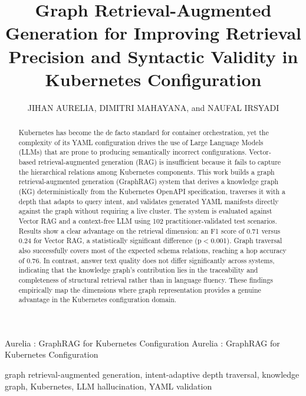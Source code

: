 \documentclass{ieeeaccess}
\begin{document}

\title{Graph Retrieval-Augmented Generation for Improving Retrieval Precision and Syntactic Validity in Kubernetes Configuration}

\author{\uppercase{Jihan Aurelia}, \uppercase{Dimitri Mahayana}, and \uppercase{Naufal Irsyadi}}
\address[1]{School of Electrical Engineering and Informatics, Institut Teknologi Bandung, Bandung 40132, Indonesia}

\markboth
{Aurelia \headeretal: GraphRAG for Kubernetes Configuration}
{Aurelia \headeretal: GraphRAG for Kubernetes Configuration}


\begin{abstract}
Kubernetes has become the de facto standard for container orchestration, yet the complexity of its YAML configuration drives the use of Large Language Models (LLMs) that are prone to producing semantically incorrect configurations. Vector-based retrieval-augmented generation (RAG) is insufficient because it fails to capture the hierarchical relations among Kubernetes components. This work builds a graph retrieval-augmented generation (GraphRAG) system that derives a knowledge graph (KG) deterministically from the Kubernetes OpenAPI specification, traverses it with a depth that adapts to query intent, and validates generated YAML manifests directly against the graph without requiring a live cluster. The system is evaluated against Vector RAG and a context-free LLM using 102 practitioner-validated test scenarios. Results show a clear advantage on the retrieval dimension: an F1 score of 0.71 versus 0.24 for Vector RAG, a statistically significant difference (p$<$0.001). Graph traversal also successfully covers most of the expected schema relations, reaching a hop accuracy of 0.76. In contrast, answer text quality does not differ significantly across systems, indicating that the knowledge graph's contribution lies in the traceability and completeness of structural retrieval rather than in language fluency. These findings empirically map the dimensions where graph representation provides a genuine advantage in the Kubernetes configuration domain.
\end{abstract}

\begin{keywords}
graph retrieval-augmented generation, intent-adaptive depth traversal, knowledge graph, Kubernetes, LLM hallucination, YAML validation
\end{keywords}
\end{document}
